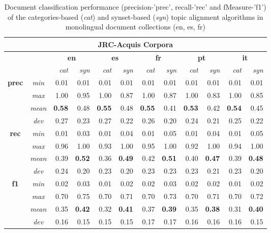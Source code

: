 \begin{table}[ht]\centering
\begin{center}
\small
\begin{tabular}{cc|rr||rr||rr||rr||rr}
    \hline
    \multicolumn{14}{c}{\textbf{JRC-Acquis Corpora}} \\
    \hline
    & & \multicolumn{2}{c}{\textbf{en}} &
      \multicolumn{2}{c}{\textbf{es}} &
      \multicolumn{2}{c}{\textbf{fr}} &
      \multicolumn{2}{c}{\textbf{pt}} &
      \multicolumn{2}{c}{\textbf{it}}\\
    & & {\textit{cat}} & {\textit{syn}} & {\textit{cat}} & {\textit{syn}} & {\textit{cat}} & {\textit{syn}} & {\textit{cat}} & {\textit{syn}} & {\textit{cat}} & {\textit{syn}} \\
    \hline
    \multirow{4}{*}{\textbf{prec}} 
    &{\textit{min}}     &0.01 &0.01 &0.01 &0.01 &0.01 &0.01 &0.01 &0.01 &0.01 &0.01 \\
    &{\textit{max}}     &1.00 &0.95 &1.00 &0.87 &1.00 &0.87 &1.00 &0.83 &1.00 &0.85\\
    &{\textit{mean}}    &\textbf{0.58} &0.48 &\textbf{0.55} &0.48 &\textbf{0.55} &0.41 &\textbf{0.53} &0.42 &\textbf{0.54} &0.45 \\
    &{\textit{dev}}     &0.27 &0.23 &0.27 &0.22 &0.26 &0.20 &0.24 &0.21 &0.25 &0.22 \\
    \hline
    \multirow{4}{*}{\textbf{rec}} 
    &{\textit{min}}     &0.01 &0.03 &0.01 &0.04 &0.01 &0.05 &0.01 &0.04 &0.01 &0.05\\
    &{\textit{max}}     &0.96 &1.00 &0.93 &1.00 &0.95 &1.00 &0.92 &1.00 &0.94 &1.00\\
    &{\textit{mean}}    &0.39 &\textbf{0.52} &0.36 &\textbf{0.49} &0.42 &\textbf{0.51} &0.40 &\textbf{0.47} &0.39 &\textbf{0.48} \\
    &{\textit{dev}}     &0.24 &0.20 &0.23 &0.20 &0.23 &0.23 &0.23 &0.21 &0.23 &0.20 \\
    \hline
    \multirow{4}{*}{\textbf{f1}} 
    &{\textit{min}}     &0.02 &0.03 &0.01 &0.02 &0.02 &0.03 &0.02 &0.02 &0.01 &0.02 \\
    &{\textit{max}}     &0.70 &0.75 &0.70 &0.71 &0.70 &0.73 &0.70 &0.71 &0.70 &0.72\\
    &{\textit{mean}}    &0.35 &\textbf{0.42} &0.32 &\textbf{0.41} &0.37 &\textbf{0.39} &0.35 &\textbf{0.38} &0.31 &\textbf{0.40} \\
    &{\textit{dev}}     &0.16 &0.15 &0.15 &0.15 &0.17 &0.17 &0.16 &0.16 &0.16 &0.15\\
\end{tabular}
\end{center}
\caption{Document classification performance (precision-'prec', recall-'rec' and fMeasure-'f1') of the categories-based (\textit{cat}) and synset-based (\textit{syn}) topic alignment algorithms in monolingual document collections (en, es, fr)}
\label{tb:mono-class}
\end{table}


